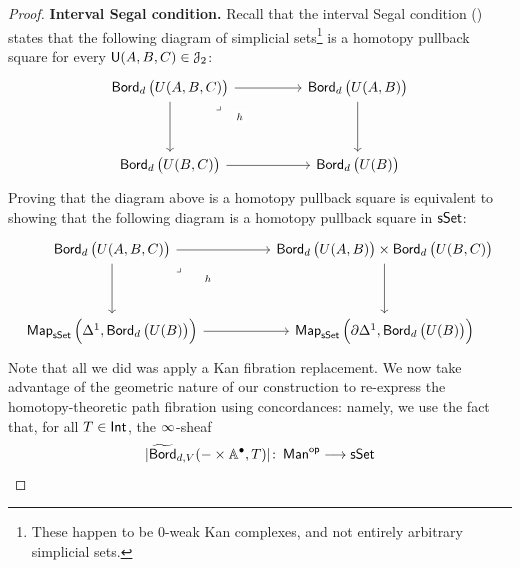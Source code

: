 \begin{proof}
    \textbf{Interval Segal condition.}
    Recall that the interval Segal condition () states that the following diagram of simplicial sets\footnote{These happen to be $0$-weak Kan complexes, and not entirely arbitrary simplicial sets.} is a homotopy pullback square for every $\mathsf U(A,B,C)\in \mathcal J_2$:
    \begin{equation}\label{eq:Segal condition for bordism}
        \begin{tikzcd}[ampersand replacement=\&]
            {\bord_d\big(U(A,B,C)\big)} \&\& {\bord_d\big(U(A,B)\big)} \\
            \\
            {\bord_d\big(U(B,C)\big)} \&\& {\bord_d\big(U(B)\big)}
            \arrow[from=1-1, to=1-3]
            \arrow[from=1-1, to=3-1]
            \arrow["h"{description, pos=0.3}, "\lrcorner"{anchor=center, pos=0.125}, draw=none, from=1-1, to=3-3]
            \arrow[from=1-3, to=3-3]
            \arrow[from=3-1, to=3-3]
        \end{tikzcd}
    \end{equation}
     Proving that the diagram above is a homotopy pullback square is equivalent to showing that the following diagram is a homotopy pullback square in $\operatorname{\sf sSet}$: 
    \begin{equation}\label{eq pullback 1}
        \begin{tikzcd}[ampersand replacement=\&]
            {\bord_d\big(U(A,B,C)\big)} \&\& {\bord_d\big(U(A,B)\big)\times \bord_d\big(U(B,C)\big)} \\
            \\
            {\Map_{\sset}\Big(\Delta^1,\bord_d\big(U(B)\big)\Big)} \&\& {\Map_{\sset}\Big(\partial\Delta^1,\bord_d\big(U(B)\big)\Big)}
            \arrow[from=1-1, to=1-3]
            \arrow[from=1-1, to=3-1]
            \arrow["h"{description, pos=0.3}, "\lrcorner"{anchor=center, pos=0.125}, draw=none, from=1-1, to=3-3]
            \arrow[from=1-3, to=3-3]
            \arrow[from=3-1, to=3-3]
        \end{tikzcd}
    \end{equation}
    Note that all we did was apply a Kan fibration replacement. We now take advantage of the geometric nature of our construction to re-express the homotopy-theoretic path fibration using concordances: namely, we use the fact that, for all $T\in \operatorname{\mathsf{Int}}$, the $\operatorname{\infty}$-sheaf 
    \begin{equation}
    |\widetilde{\bord}_{d,V}(-\times \AA^{\bullet},T)| \maps \man^{\op} \longra \sset 

\end{equation}
\end{proof}
